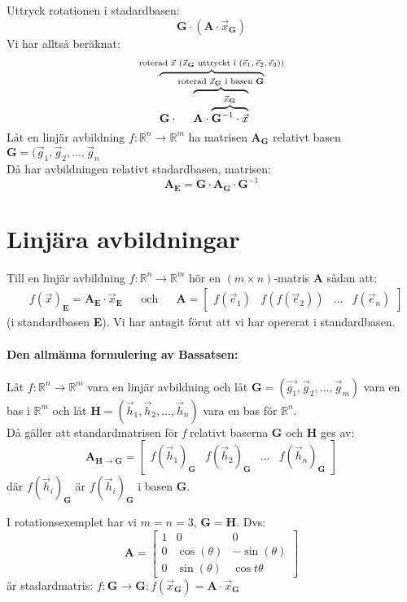 Uttryck rotationen i stadardbasen:
\[
\mathbf{G} \cdot (\mathbf{A} \cdot \vec{x}_{\mathbf{G}})
\]
Vi har alltså beräknat:
\[
\overbrace{\mathbf{G} \cdot \overbrace{\mathbf{A} \cdot \overbrace{\mathbf{G}^{-1} \cdot \vec{x}}^{\vec{x}_{\mathbf{G}}}}^\text{roterad $\vec{x}_{\mathbf{G}}$ i basen \textbf{G}}}^\text{roterad $\vec{x}$ ($\vec{x}_{\mathbf{G}}$ uttryckt i ($\vec{e}_1, \vec{e}_2, \vec{e}_3$))}
\]
Låt en linjär avbildning $f: \mathbb{R}^n \rightarrow \mathbb{R}^m$ ha matrisen $\mathbf{A}_{\mathbf{G}}$ relativt basen $\mathbf{G} = (\vec{g}_1, \vec{g}_2, ..., \vec{g}_n$\\
Då har avbildningen relativt stadardbasen, matrisen:
\[
\mathbf{A}_{\mathbf{E}} = \mathbf{G} \cdot \mathbf{A}_{\mathbf{G}} \cdot \mathbf{G}^{-1}
\]
\section{Linjära avbildningar} %
\label{sec:linj_ra_avbildningar}
Till en linjär avbildning $f: \mathbb{R}^n \rightarrow \mathbb{R}^m$ hör en $(m \times n)$-matris \textbf{A} sådan att:
\begin{align*}
&f(\vec{x})_{\mathbf{E}} = \mathbf{A}_{\mathbf{E}} \cdot \vec{x}_{\mathbf{E}}
&&\mbox{och}
&&\mathbf{A} = \begin{bmatrix} f(\vec{e}_1)&f(f(\vec{e}_2))&...&f(\vec{e}_n) \end{bmatrix}
\end{align*}
(i standardbasen \textbf{E}). Vi har antagit förut att vi har opererat i standardbasen.
\paragraph{Den allmänna formulering av Bassatsen:} %
\label{par:den_allm_nna_formulering_av_bassatsen_}
Låt $f:\mathbb{R}^n \rightarrow \mathbb{R}^m$ vara en linjär avbildning och låt $\mathbf{G} = (\vec{g_1}, \vec{g}_2, ..., \vec{g}_m)$ vara en bas i $\mathbb{R}^m$ och låt $\mathbf{H} = (\vec{h}_1, \vec{h}_2, ..., \vec{h}_n)$ vara en bas för $\mathbb{R}^n$.\\
Då gäller att standardmatrisen för \textit{f} relativt baserna \textbf{G} och \textbf{H} ges av:
\[
 \mathbf{A}_{\mathbf{H} \rightarrow \mathbf{G}} = \begin{bmatrix} f(\vec{h}_1)_{\mathbf{G}} & f(\vec{h}_2)_{\mathbf{G}}&...& f(\vec{h}_n)_{\mathbf{G}} \end{bmatrix}
 \]
 där $f(\vec{h}_i)_{\mathbf{G}}$ är $f(\vec{h}_i)_{\mathbf{G}}$ i basen \textbf{G}.
\begin{Ex}
	I rotationsexemplet har vi $m=n=3$, $\mathbf{G}=\mathbf{H}$. Dvs:
	\[
	\mathbf{A} =
	\begin{bmatrix}
	1 & 0 & 0\\
	0 & \cos(\theta) & -\sin(\theta)\\
	0 & \sin(\theta) & \cos{t\theta}
	\end{bmatrix}
	\]
	är stadardmatris: $f: \mathbf{G} \rightarrow \mathbf{G}: f(\vec{x}_{\mathbf{G}}) = \mathbf{A} \cdot \vec{x}_{\mathbf{G}}$
\end{Ex}
